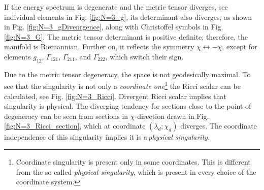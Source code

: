 If the energy spectrum is degenerate and the metric tensor diverges, see individual elements in Fig. \ref{fig:N=3_g}, its determinant also diverges, as shown in Fig. \ref{fig:N=3_gDivenrgence}, along with Christoffel symbols in Fig. \ref{fig:N=3_G}. The metric tensor determinant is positive definite; therefore, the manifold is Riemannian. Further on, it reflects the symmetry $\chi\leftrightarrow-\chi$, except for elements $g_{12}$, $\Gamma_{121}$, $\Gamma_{211}$, and $\Gamma_{222}$, which switch their sign.

Due to the metric tensor degeneracy, the space is not geodesically maximal. To see that the singularity is not only a \emph{coordinate one}\footnote{Coordinate singularity is present only in some coordinates. This is different from the so-called \emph{physical singularity}, which is present in every choice of the coordinate system.} the Ricci scalar can be calculated, see Fig. \ref{fig:N=3_Ricci}. Divergent Ricci scalar implies that singularity is physical. The diverging tendency for sections close to the point of degeneracy can be seen from sections in $\chi$-direction drawn in Fig. \ref{fig:N=3_Ricci_section}, which at coordinate $(\lambda_d;\chi_d)$ diverges. The coordinate independence of this singularity implies it is a\,\emph{physical singularity}. 


